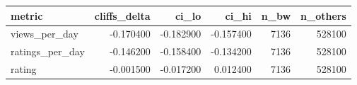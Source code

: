 \begin{tabular}{lrrrrr}
\toprule
metric & cliffs_delta & ci_lo & ci_hi & n_bw & n_others \\
\midrule
views_per_day & -0.170400 & -0.182900 & -0.157400 & 7136 & 528100 \\
ratings_per_day & -0.146200 & -0.158400 & -0.134200 & 7136 & 528100 \\
rating & -0.001500 & -0.017200 & 0.012400 & 7136 & 528100 \\
\bottomrule
\end{tabular}
